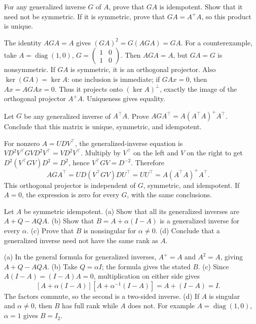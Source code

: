 \begin{problem}\label{ex:10:generalized-projector}
For any generalized inverse \(G\) of \(A\), prove that \(GA\) is
idempotent. Show that it need not be symmetric. If it is symmetric,
prove that \(GA=A^+A\), so this product is unique.
\end{problem}
\begin{solution}
The identity \(AGA=A\) gives \((GA)^2=G(AGA)=GA\).
For a counterexample, take
\(A=\operatorname{diag}(1,0)\),
\(G=\begin{pmatrix}1&0\\1&0\end{pmatrix}\).
Then \(AGA=A\), but \(GA=G\) is nonsymmetric.
If \(GA\) is symmetric, it is an orthogonal projector.
Also \(\ker(GA)=\ker A\): one inclusion is immediate; if \(GAx=0\),
then \(Ax=AGAx=0\). Thus it projects onto \((\ker A)^\perp\), exactly
the image of the orthogonal projector \(A^+A\). Uniqueness gives equality.
\end{solution}

\begin{problem}\label{ex:10:generalized-fit}
Let \(G\) be any generalized inverse of \(A^\top A\).
Prove \(AGA^\top=A(A^\top A)^+A^\top\).
Conclude that this matrix is unique, symmetric, and idempotent.
\end{problem}
\begin{solution}
For nonzero \(A=UDV^\top\), the generalized-inverse equation is
\(VD^2V^\top GVD^2V^\top=VD^2V^\top\).
Multiply by \(V^\top\) on the left and \(V\) on the right to get
\(D^2(V^\top GV)D^2=D^2\), hence \(V^\top GV=D^{-2}\).
Therefore
\[
AGA^\top=UD(V^\top GV)DU^\top=UU^\top
=A(A^\top A)^+A^\top.
\]
This orthogonal projector is independent of \(G\), symmetric, and idempotent.
If \(A=0\), the expression is zero for every \(G\), with the same conclusions.
\end{solution}

\begin{problem}\label{ex:10:generalized-rank}
Let \(A\) be symmetric idempotent.
(a) Show that all its generalized inverses are \(A+Q-AQA\).
(b) Show that \(B=A+\alpha(I-A)\) is a generalized inverse for every \(\alpha\).
(c) Prove that \(B\) is nonsingular for \(\alpha\ne0\).
(d) Conclude that a generalized inverse need not have the same rank as \(A\).
\end{problem}
\begin{solution}
(a) In the general formula for generalized inverses, \(A^+=A\) and
\(A^2=A\), giving \(A+Q-AQA\).
(b) Take \(Q=\alpha I\); the formula gives the stated \(B\).
(c) Since \(A(I-A)=(I-A)A=0\), multiplication on either side gives
\[
[A+\alpha(I-A)][A+\alpha^{-1}(I-A)]=A+(I-A)=I.
\]
The factors commute, so the second is a two-sided inverse.
(d) If \(A\) is singular and \(\alpha\ne0\), then \(B\) has full rank
while \(A\) does not. For example \(A=\operatorname{diag}(1,0)\),
\(\alpha=1\) gives \(B=I_2\).
\end{solution}

